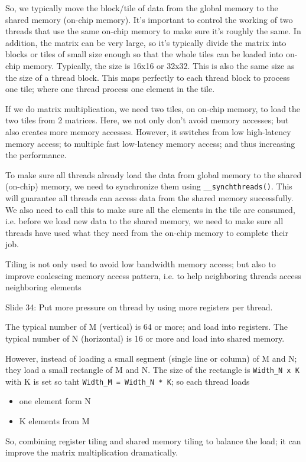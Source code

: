 So, we typically move the block/tile of data from the global memory to
the shared memory (on-chip memory). It's important to control the
working of two threads that use the same on-chip memory to make sure
it's roughly the same. In addition, the matrix can be very large, so
it's typically divide the matrix into blocks or tiles of small size
enough so that the whole tiles can be loaded into on-chip
memory. Typically, the size is 16x16 or 32x32. This is also the same
size as the size of a thread block. This maps perfectly to each thread
block to process one tile; where one thread process one element in the
tile. 

If we do matrix multiplication, we need two tiles, on on-chip memory,
to load the two tiles from 2 matrices. Here, we not only don't avoid
memory accesses; but also creates more memory accesses. However, it
switches from low high-latency memory access; to multiple fast
low-latency memory access; and thus increasing the performance. 

To make sure all threads already load the data from global memory to
the shared (on-chip) memory, we need to synchronize them using
\verb!__synchthreads()!. This will guarantee all threads can access
data from the shared memory successfully. We also need to call this to
make sure all the elements in the tile are consumed, i.e. before we
load new data to the shared memory, we need to make sure all threads
have used what they need from the on-chip memory to complete their
job.


Tiling is not only used to avoid low bandwidth memory access; but also
to improve coalescing memory access pattern, i.e. to help neighboring
threads access neighboring elements



Slide 34: Put more pressure on thread by using more registers per
thread. 

The typical number of M (vertical) is 64 or more; and load into
registers. The typical number of N (horizontal) is 16 or more and load
into shared memory.

However, instead of loading a small segment (single line or column) of
M and N; they load a small rectangle of M and N. The size of the
rectangle is \verb!Width_N x K! with K is set so taht
\verb!Width_M = Width_N * K!; so each thread loads
\begin{itemize}
\item one element form N 
\item K elements from M 
\end{itemize}
So, combining register tiling and shared memory tiling to balance the
load; it can improve the matrix multiplication dramatically. 


